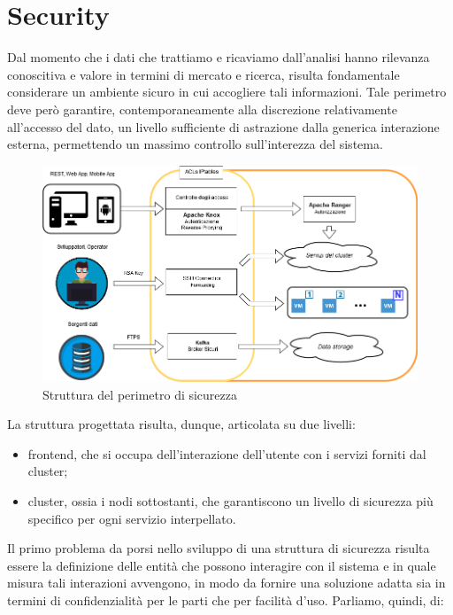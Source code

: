 \chapter{Security}

Dal momento che i dati che trattiamo e ricaviamo dall'analisi hanno rilevanza conoscitiva e valore in termini di mercato e ricerca, risulta fondamentale considerare un ambiente sicuro in cui accogliere tali informazioni. Tale perimetro deve però garantire, contemporaneamente alla discrezione relativamente all'accesso del dato, un livello sufficiente di astrazione dalla generica interazione esterna, permettendo un massimo controllo sull'interezza del sistema.

\begin{figure}
	\centering
	\includegraphics[scale=0.4]{Figures/security_diagram.png}
	\decoRule
	\caption[Infrastructural Stack]{Struttura del perimetro di sicurezza}
	\label{fig:security_diagram}
\end{figure}
La struttura progettata risulta, dunque, articolata su due livelli:
\begin{itemize}
	\item frontend, che si occupa dell'interazione dell'utente con i servizi forniti dal cluster;
	\item cluster, ossia i nodi sottostanti, che garantiscono un livello di sicurezza più specifico per ogni servizio interpellato.
\end{itemize}
Il primo problema da porsi nello sviluppo di una struttura di sicurezza risulta essere la definizione delle entità che possono interagire con il sistema e in quale misura tali interazioni avvengono, in modo da fornire una soluzione adatta sia in termini di confidenzialità per le parti che per facilità d'uso.
\newline
Parliamo, quindi, di:
